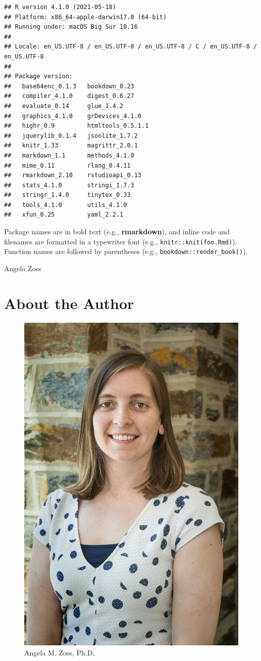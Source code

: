 \documentclass[
]{krantz}
\begin{document}
\begin{verbatim}
## R version 4.1.0 (2021-05-18)
## Platform: x86_64-apple-darwin17.0 (64-bit)
## Running under: macOS Big Sur 10.16
## 
## Locale: en_US.UTF-8 / en_US.UTF-8 / en_US.UTF-8 / C / en_US.UTF-8 / en_US.UTF-8
## 
## Package version:
##   base64enc_0.1.3   bookdown_0.23    
##   compiler_4.1.0    digest_0.6.27    
##   evaluate_0.14     glue_1.4.2       
##   graphics_4.1.0    grDevices_4.1.0  
##   highr_0.9         htmltools_0.5.1.1
##   jquerylib_0.1.4   jsonlite_1.7.2   
##   knitr_1.33        magrittr_2.0.1   
##   markdown_1.1      methods_4.1.0    
##   mime_0.11         rlang_0.4.11     
##   rmarkdown_2.10    rstudioapi_0.13  
##   stats_4.1.0       stringi_1.7.3    
##   stringr_1.4.0     tinytex_0.33     
##   tools_4.1.0       utils_4.1.0      
##   xfun_0.25         yaml_2.2.1
\end{verbatim}

Package names are in bold text (e.g., \textbf{rmarkdown}), and inline code and filenames are formatted in a typewriter font (e.g., \texttt{knitr::knit(\textquotesingle{}foo.Rmd\textquotesingle{})}). Function names are followed by parentheses (e.g., \texttt{bookdown::render\_book()}).

\begin{flushright}
Angela Zoss
\end{flushright}

\hypertarget{about-the-author}{%
\chapter*{About the Author}\label{about-the-author}}


\begin{figure}
\includegraphics[width=0.328\linewidth]{images/angela_zoss} \caption{Angela M. Zoss, Ph.D.}\label{fig:knitr-logo}
\end{figure}
\end{document}

